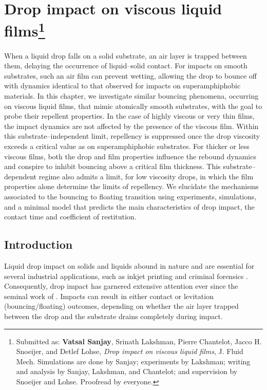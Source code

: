 \chapter[Drop impact on viscous liquid films]{Drop impact on viscous liquid films\footnote{Submitted as: \textbf{Vatsal Sanjay}, Srinath Lakshman, Pierre Chantelot, Jacco H. Snoeijer, and Detlef Lohse, \textit{Drop impact on viscous liquid films}, J. Fluid Mech. Simulations are done by Sanjay; experiments by Lakshman; writing and analysis by Sanjay, Lakshman, and Chantelot; and supervision by Snoeijer and Lohse. Proofread by everyone.}}
\label{chap:DropBouncingOnFilm}

When a liquid drop falls on a solid substrate, an air layer is trapped between them, delaying the occurrence of liquid--solid contact. For impacts on smooth substrates, such an air film can prevent wetting, allowing the drop to bounce off with dynamics identical to that observed for impacts on superamphiphobic materials. In this chapter, we investigate similar bouncing phenomena, occurring on viscous liquid films, that mimic atomically smooth substrates, with the goal to probe their repellent properties. In the case of highly viscous or very thin films, the impact dynamics are not affected by the presence of the viscous film. Within this substrate--independent limit, repellency is suppressed once the drop viscosity exceeds a critical value as on superamphiphobic substrates. For thicker or less viscous films, both the drop and film properties influence the rebound dynamics and conspire to inhibit bouncing above a critical film thickness. This substrate--dependent regime also admits a limit, for low viscosity drops, in which the film properties alone determine the limits of repellency. We elucidate the mechanisms associated to the bouncing to floating transition using experiments, simulations, and a minimal model that predicts the main characteristics of drop impact, the contact time and coefficient of restitution.

\clearpage


\section{Introduction}
\label{sec:Intro}

Liquid drop impact on solids and liquids abound in nature \citep{yarin2017} and are essential for several industrial applications, such as inkjet printing \citep{lohse2022fundamental} and criminal forensics \citep{smith2018influence}. Consequently, drop impact has garnered extensive attention \citep{rein1993phenomena, weiss1999single, thoroddsen2008high, yarin2006drop, josserand2016drop} ever since the seminal work of \citet{worthington1877xxviii, worthington2019study}. Impacts can result in either contact or levitation (bouncing/floating) outcomes, depending on whether the air layer trapped between the drop and the substrate drains completely during impact. 

